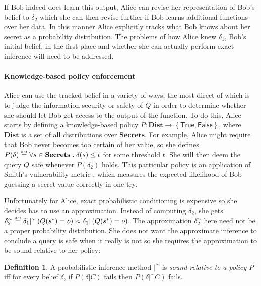 \documentclass{article} %
\newcommand{\ra}{\rightarrow}
\newcommand{\secrets}[0]{\textbf{Secrets}}
\newcommand{\asecret}[0]{s}
\newcommand{\rsecret}[0]{\asecret^*}
\newcommand{\dists}[0]{\textbf{Dist}}
\newcommand{\sconst}[1]{\ensuremath{\mathsf{#1}}}
\newcommand{\strue}{\sconst{True}}
\newcommand{\sfalse}{\sconst{False}}
\newcommand{\paren}[1]{\left( #1 \right)}
\newcommand{\set}[1]{\left\{ #1 \right\}}
\newcommand{\acond}[0]{|^\sim}
\newcommand{\qsep}[0]{\; . \;}
\newcommand{\stacklabel}[1]{\stackrel{\smash{\scriptscriptstyle \mathrm{#1}}}}
\newcommand{\defeq}{\stacklabel{def}=}
\theoremstyle{plain} %
\theoremstyle{definition} %
\newtheorem*{definition-un}{Definition}
\begin{document}
If Bob indeed does learn this output, Alice can revise her
representation of Bob's belief to $ \delta_2 $ which she can then
revise further if Bob learns additional functions over her data. In
this manner Alice explicitly tracks what Bob knows about her secret
as a probability distribution. The problems of how Alice knew $
\delta_1 $, Bob's initial belief, in the first place and whether she
can actually perform exact inference will need to be
addressed.

\paragraph*{Knowledge-based policy enforcement} Alice can use the tracked
belief in a variety of ways, the most direct
of which is to judge the information security or safety of $ Q $ in
order to determine whether she should let Bob get access to the output
of the function. To do this, Alice starts by defining a
knowledge-based policy $ P : \dists \ra \set{\strue,\sfalse} $, where
$ \dists $ is a set of all distributions over $ \secrets $. For
example, Alice might require that Bob never becomes too certain of her
value, so she defines $ P(\delta) \defeq \forall \asecret \in \secrets \qsep
\delta(\asecret) \leq t $ for some threshold $ t $. She will then deem the
query $ Q $ safe whenever $ P(\delta_2) $ holds. This particular
policy is an application of Smith's vulnerability metric
\cite{smith09foundations}, which measures the expected likelihood of
Bob guessing a secret value correctly in one try.

Unfortunately for Alice, exact probabilistic conditioning is expensive
so she decides has to use an approximation. Instead of computing $
\delta_2 $, she gets $ \delta_2^\sim \defeq \delta_1 \acond
\paren{Q(\rsecret) = o} \approx \delta_1 | \paren{Q(\rsecret) = o} $. The
approximation $ \delta_2^\sim $ here need not be a proper probability
distribution. She does not want the approximate inference to conclude
a query is safe when it really is not so she requires the
approximation to be sound relative to her policy:

\begin{definition-un} A probabilistic inference method $ |^\sim $ is
  \emph{sound relative to a policy $ P $} iff for every belief $
  \delta $, if $ P(\delta | C) $ fails then $ P(\delta |^\sim C) $
  fails.
\end{definition-un}
\end{document}
